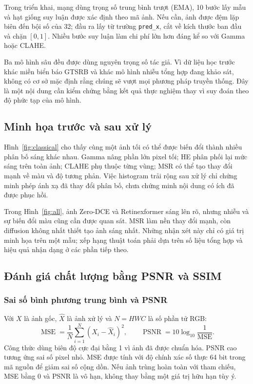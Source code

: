 Trong triển khai, mạng dùng trọng số trung bình trượt (EMA), 10 bước lấy mẫu và hạt giống suy luận được xác định theo mã ảnh. Nếu cần, ảnh được đệm lặp biên đến bội số của 32; đầu ra lấy từ trường \texttt{pred\_x}, cắt về kích thước ban đầu và chặn $[0,1]$. Nhiều bước suy luận làm chi phí lớn hơn đáng kể so với Gamma hoặc CLAHE.

Ba mô hình sâu đều được dùng nguyên trọng số tác giả. Vì dữ liệu học trước khác miền biển báo GTSRB và khác mô hình nhiễu tổng hợp đang khảo sát, không có cơ sở mặc định rằng chúng sẽ vượt mọi phương pháp truyền thống. Đây là một nội dung cần kiểm chứng bằng kết quả thực nghiệm thay vì suy đoán theo độ phức tạp của mô hình.

\subsection{Minh họa trước và sau xử lý}
Hình~\ref{fig:classical} cho thấy cùng một ảnh tối có thể được biến đổi thành nhiều phân bố sáng khác nhau. Gamma nâng phần lớn pixel tối; HE phân phối lại mức sáng trên toàn ảnh; CLAHE phụ thuộc từng vùng; MSR có thể tạo thay đổi mạnh về màu và độ tương phản. Việc histogram trải rộng sau xử lý chỉ chứng minh phép ánh xạ đã thay đổi phân bố, chưa chứng minh nội dung có ích đã được phục hồi.

Trong Hình~\ref{fig:all}, ảnh Zero-DCE và Retinexformer sáng lên rõ, nhưng nhiễu và sự biến đổi màu cũng cần được quan sát. MSR làm nền thay đổi mạnh, còn diffusion không nhất thiết tạo ảnh sáng nhất. Những nhận xét này chỉ có giá trị minh họa trên một mẫu; xếp hạng thuật toán phải dựa trên số liệu tổng hợp và hiệu quả nhận dạng ở các phần tiếp theo.

\subsection{Đánh giá chất lượng bằng PSNR và SSIM}
\subsubsection{Sai số bình phương trung bình và PSNR}
Với $X$ là ảnh gốc, $\widehat{X}$ là ảnh xử lý và $N=HWC$ là số phần tử RGB:
\begin{equation}
\operatorname{MSE}=\frac{1}{N}\sum_{i=1}^{N}(X_i-\widehat{X}_i)^2,
\qquad \operatorname{PSNR}=10\log_{10}\frac{1}{\operatorname{MSE}}.
\end{equation}
Công thức dùng biên độ cực đại bằng 1 vì ảnh đã được chuẩn hóa. PSNR cao tương ứng sai số pixel nhỏ. MSE được tính với độ chính xác số thực 64 bit trong mã nguồn để giảm sai số cộng dồn. Nếu ảnh trùng hoàn toàn với tham chiếu, MSE bằng 0 và PSNR là vô hạn, không thay bằng một giá trị hữu hạn tùy ý.

